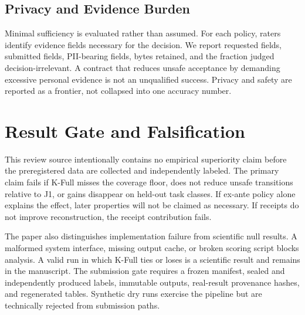 \documentclass[sigconf,anonymous,review]{acmart}
\begin{document}
\subsection{Privacy and Evidence Burden}
Minimal sufficiency is evaluated rather than assumed. For each policy, raters identify evidence fields necessary for the decision. We report requested fields, submitted fields, PII-bearing fields, bytes retained, and the fraction judged decision-irrelevant. A contract that reduces unsafe acceptance by demanding excessive personal evidence is not an unqualified success. Privacy and safety are reported as a frontier, not collapsed into one accuracy number.

\section{Result Gate and Falsification}
This review source intentionally contains no empirical superiority claim before the preregistered data are collected and independently labeled. The primary claim fails if K-Full misses the coverage floor, does not reduce unsafe transitions relative to J1, or gains disappear on held-out task classes. If ex-ante policy alone explains the effect, later properties will not be claimed as necessary. If receipts do not improve reconstruction, the receipt contribution fails.

The paper also distinguishes implementation failure from scientific null results. A malformed system interface, missing output cache, or broken scoring script blocks analysis. A valid run in which K-Full ties or loses is a scientific result and remains in the manuscript. The submission gate requires a frozen manifest, sealed and independently produced labels, immutable outputs, real-result provenance hashes, and regenerated tables. Synthetic dry runs exercise the pipeline but are technically rejected from submission paths.

\begin{table}[t]
\centering
\caption{Frozen main-result structure. Dashes are intentionally retained until confirmatory results pass the provenance gate. UPT denotes unsafe positive transition rate.}
\resizebox{\textwidth}{!}{}
\label{tab:mainresults}
\end{table}

\begin{table}[t]
\centering
\caption{Property-level result structure.}
\resizebox{\columnwidth}{!}{}
\label{tab:propertyresults}
\end{table}
\end{document}
